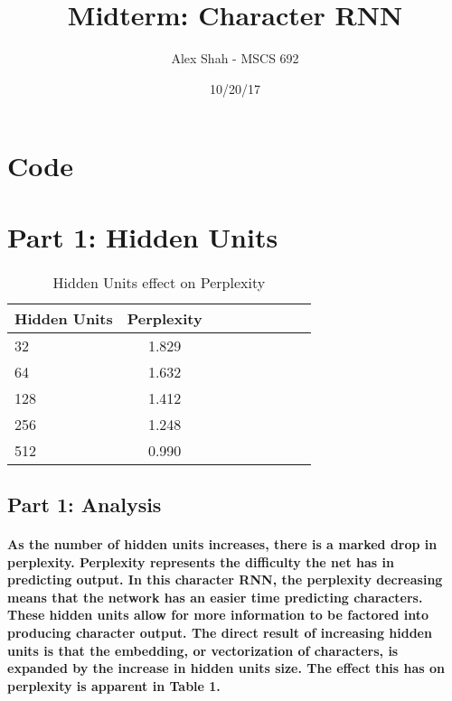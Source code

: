 \documentclass[10pt,a4paper]{report}
\title{Midterm: Character RNN}
\author{Alex Shah - MSCS 692}
\date{10/20/17}
\begin{document}
\lstset{language=Python}
\maketitle

\section{Code}


\clearpage

\section{Part 1: Hidden Units}

\begin{table}[h]
 \caption{Hidden Units effect on Perplexity}
 \label{tbl:aTable}
 \begin{center}
  \begin{tabular}{lccrrrrrr}
    \hline 
	Hidden Units & Perplexity\\
	\hline
	32 & 1.829\\
	64 & 1.632\\
	128 & 1.412\\
	256 & 1.248\\
	512 & 0.990\\
  \end{tabular}
 \end{center}
\end{table}

\subsection{Part 1: Analysis}

\paragraph{
As the number of hidden units increases, there is a marked drop in perplexity. Perplexity represents the difficulty the net has in predicting output. In this character RNN, the perplexity decreasing means that the network has an easier time predicting characters. These hidden units allow for more information to be factored into producing character output. The direct result of increasing hidden units is that the embedding, or vectorization of characters, is expanded by the increase in hidden units size. The effect this has on perplexity is apparent in Table 1.
}
\
\vspace{5mm}
\end{document}
